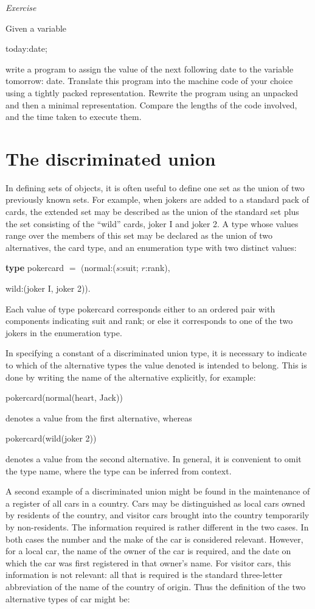 \noindent
\textit{Exercise}
\nopagebreak

\noindent
Given a variable

\quad today:date;

\noindent
write a program to assign the value of the next following date to the variable tomorrow: date. Translate this program into the machine code of your choice using a tightly packed representation. Rewrite the program using an unpacked and then a minimal representation. Compare the lengths of the code involved, and the time taken to execute them.

\section{The discriminated union}

In defining sets of objects, it is often useful to define one set as the union of two previously known sets. For example, when jokers are added to a standard pack of cards, the extended set may be described as the union of the standard set plus the set consisting of the ``wild'' cards, joker I and joker 2. A type whose values range over the members of this set may be declared as the union of two alternatives, the card type, and an enumeration type with two distinct values:

\quad \textbf{type} pokercard $=$ (normal:($s$:suit; $r$:rank),

\tabto{10.2em}wild:(joker I, joker 2)).

\noindent
Each value of type pokercard corresponds either to an ordered pair with components indicating suit and rank; or else it corresponds to one of the two jokers in the enumeration type.

In specifying a constant of a discriminated union type, it is necessary to indicate to which of the alternative types the value denoted is intended to belong. This is done by writing the name of the alternative explicitly, for example:

\quad pokercard(normal(heart, Jack))

\noindent
denotes a value from the first alternative, whereas

\quad pokercard(wild(joker 2))

\noindent
denotes a value from the second alternative. In general, it is convenient to omit the type name, where the type can be inferred from context.

A second example of a discriminated union might be found in the maintenance of a register of all cars in a country. Cars may be distinguished as local cars owned by residents of the country, and visitor cars brought into the country temporarily by non-residents. The information required is rather different in the two cases. In both cases the number and the make of the car is considered relevant. However, for a local car, the name of the owner of the car is required, and the date on which the car was first registered in that owner's name. For visitor cars, this information is not relevant: all that is required is the standard three-letter abbreviation of the name of the country of origin. Thus the definition of the two alternative types of car might be:


